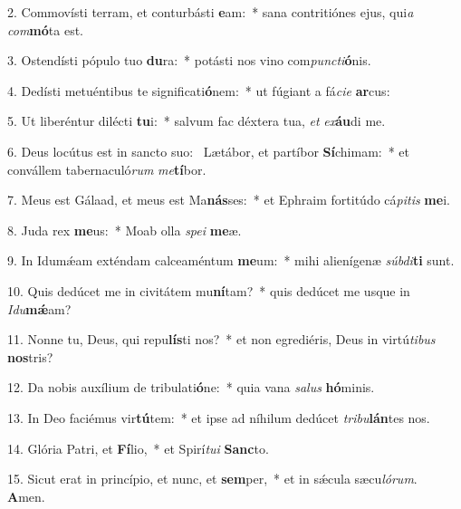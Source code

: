 2. Commovísti terram, et conturbásti \textbf{e}am:~*  sana contritiónes ejus, qui\textit{a} \textit{com}\textbf{mó}ta est.\

3. Ostendísti pópulo tuo \textbf{du}ra:~*  potásti nos vino com\textit{punc}\textit{ti}\textbf{ó}nis.\

4. Dedísti metuéntibus te significati\textbf{ó}nem:~*  ut fúgiant a fá\textit{ci}\textit{e} \textbf{ar}cus:\

5. Ut liberéntur dilécti \textbf{tu}i:~*  salvum fac déxtera tua, \textit{et} \textit{ex}\textbf{áu}di me.\

6. Deus locútus est in sancto suo: \dag\  Lætábor, et partíbor \textbf{Sí}chimam:~*  et convállem tabernaculó\textit{rum} \textit{me}\textbf{tí}bor.\

7. Meus est Gálaad, et meus est Ma\textbf{nás}ses:~*  et Ephraim fortitúdo cá\textit{pi}\textit{tis} \textbf{me}i.\

8. Juda rex \textbf{me}us:~*  Moab olla \textit{spe}\textit{i} \textbf{me}æ.\

9. In Idumǽam exténdam calceaméntum \textbf{me}um:~*  mihi alienígenæ \textit{súb}\textit{di}\textbf{ti} sunt.\

10. Quis dedúcet me in civitátem mu\textbf{ní}tam?~*  quis dedúcet me usque in \textit{I}\textit{du}\textbf{mǽ}am?\

11. Nonne tu, Deus, qui repu\textbf{lís}ti nos?~*  et non egrediéris, Deus in virtú\textit{ti}\textit{bus} \textbf{nos}tris?\

12. Da nobis auxílium de tribulati\textbf{ó}ne:~*  quia vana \textit{sa}\textit{lus} \textbf{hó}minis.\

13. In Deo faciémus vir\textbf{tú}tem:~*  et ipse ad níhilum dedúcet \textit{tri}\textit{bu}\textbf{lán}tes nos.\

14. Glória Patri, et \textbf{Fí}lio,~*  et Spirí\textit{tu}\textit{i} \textbf{Sanc}to.\

15. Sicut erat in princípio, et nunc, et \textbf{sem}per,~*  et in sǽcula sæcu\textit{ló}\textit{rum}. \textbf{A}men.\

